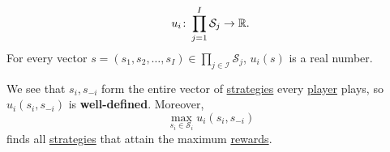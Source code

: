 \begin{prev}
\begin{itemize}
		      \[
			      u_{i}\colon \prod\limits_{j = 1}^{I} \mathcal{S}_{j}\to \mathbb{\MakeUppercase{R}}.
		      \]
		      For every vector \(s = (s_1, s_2, \ldots , s_I)\in \prod\limits_{j\in \mathcal{I}} \mathcal{S}_j\), \(u_{i}(s)\)
		      is a real number.
	\end{itemize}
	\begin{remark}
		We see that \(s_{i}, s_{-i}\) form the entire vector of \hyperref[def:strategy]{strategies} every \hyperref[def:player]{player} plays, so
		\(u_{i}(s_{i}, s_{-i})\) is \textbf{well-defined}. Moreover,
		\[
			\max_{s_{i}\in\mathcal{S}_i}u_{i}(s_{i}, s_{-i})
		\]
		finds all \hyperref[def:strategy]{strategies} that attain the maximum \hyperref[def:reward]{rewards}.
	\end{remark}
\end{prev}

